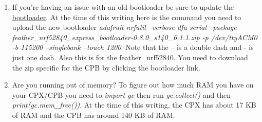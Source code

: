 \begin{enumerate}[itemsep=-5pt]
  \item If you're having an issue with an old bootloader be sure to update the \href{https://learn.adafruit.com/adafruit-circuit-playground-bluefruit/update-bootloader-use-command-line}{bootloader}. At the time of this writing here is the command you need to upload the new bootloader {\it adafruit-nrfutil --verbose dfu serial --package feather\_nrf52840\_express\_bootloader-0.8.0\_s140\_6.1.1.zip -p /dev/ttyACM0 -b 115200 --singlebank --touch 1200}. Note that the -- is a double dash and - is just one dash. Also this is for the feather\_nrf52840. You need to download the zip specific for the CPB by clicking the bootloader link. 
  \item Are you running out of memory? To figure out how much RAM you have on your CPX/CPB you need to {\it import gc} then run {\it gc.collect()} and then {\it print(gc.mem\_free())}. At the time of this writing, the CPX has about 17 KB of RAM and the CPB has around 140 KB of RAM. 
\end{enumerate}
